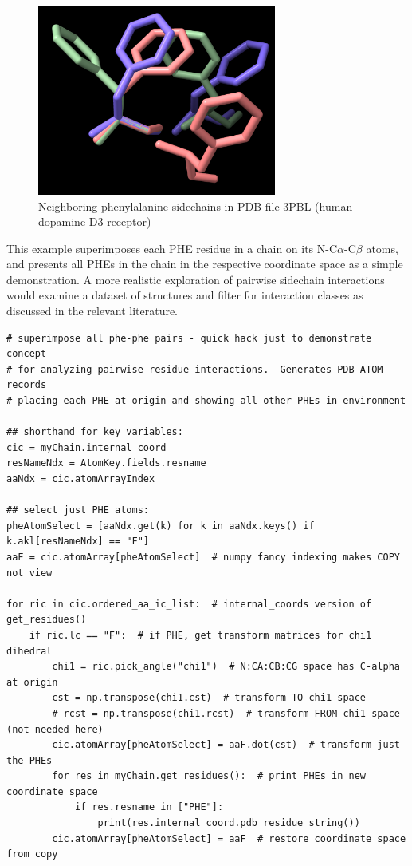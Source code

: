 \begin{figure}[htbp]
\centering
\includegraphics[width=0.7\textwidth]{images/phe-pairs-3pbl.png}
\caption{Neighboring phenylalanine sidechains in PDB file 3PBL (human dopamine D3 receptor)}
\label{fig:phepairs}
\end{figure}

This example superimposes each PHE residue in a chain on its N-C$\alpha$-C$\beta$ atoms,
and presents all PHEs in the chain in the respective coordinate space as a simple demonstration.
A more realistic exploration of pairwise sidechain interactions would examine a dataset of
structures and filter for interaction classes as discussed in the relevant literature.

\begin{verbatim}
# superimpose all phe-phe pairs - quick hack just to demonstrate concept
# for analyzing pairwise residue interactions.  Generates PDB ATOM records
# placing each PHE at origin and showing all other PHEs in environment

## shorthand for key variables:
cic = myChain.internal_coord
resNameNdx = AtomKey.fields.resname
aaNdx = cic.atomArrayIndex

## select just PHE atoms:
pheAtomSelect = [aaNdx.get(k) for k in aaNdx.keys() if k.akl[resNameNdx] == "F"]
aaF = cic.atomArray[pheAtomSelect]  # numpy fancy indexing makes COPY not view

for ric in cic.ordered_aa_ic_list:  # internal_coords version of get_residues()
    if ric.lc == "F":  # if PHE, get transform matrices for chi1 dihedral
        chi1 = ric.pick_angle("chi1")  # N:CA:CB:CG space has C-alpha at origin
        cst = np.transpose(chi1.cst)  # transform TO chi1 space
        # rcst = np.transpose(chi1.rcst)  # transform FROM chi1 space (not needed here)
        cic.atomArray[pheAtomSelect] = aaF.dot(cst)  # transform just the PHEs
        for res in myChain.get_residues():  # print PHEs in new coordinate space
            if res.resname in ["PHE"]:
                print(res.internal_coord.pdb_residue_string())
        cic.atomArray[pheAtomSelect] = aaF  # restore coordinate space from copy
\end{verbatim}

